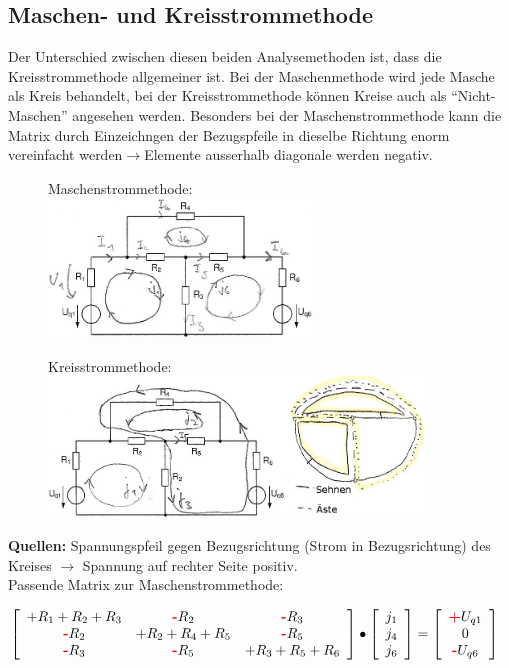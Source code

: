 \subsection{Maschen- und Kreisstrommethode}
Der Unterschied zwischen diesen beiden Analysemethoden ist, dass die Kreisstrommethode allgemeiner ist. Bei der Maschenmethode wird jede Masche als Kreis behandelt, bei der Kreisstrommethode können Kreise auch als "`Nicht-Maschen"' angesehen werden.
Besonders bei der Maschenstrommethode kann die Matrix durch Einzeichngen der Bezugspfeile in dieselbe Richtung enorm vereinfacht werden$\rightarrow$Elemente ausserhalb diagonale werden negativ.
\begin{figure}[hct]
  \begin{minipage}[t]{8 cm} %
	  \centering
	  Maschenstrommethode:\\
	  \includegraphics[width=7cm]{pics/dcnet/maschenmethode}
	 \end{minipage}
	 \begin{minipage}[t]{10 cm}
	  \centering
	  Kreisstrommethode:\\
	  \includegraphics[width=10cm]{pics/dcnet/kreisstrommethode} 
  \end{minipage}
\end{figure}

\textbf{Quellen:} Spannungspfeil gegen Bezugsrichtung (Strom in Bezugsrichtung) des Kreises $\rightarrow$ Spannung auf rechter Seite positiv.\\

Passende Matrix zur Maschenstrommethode:

$\left[\begin{array}{ccc}
	+R_1+R_2+R_3 &\text{\textbf{\textcolor{red}{-}}}R_2 &\text{\textbf{\textcolor{red}{-}}}R_3  \\
	\text{\textbf{\textcolor{red}{-}}}R_2 &+R_2+R_4+R_5
	&\text{\textbf{\textcolor{red}{-}}}R_5\\ 
	\text{\textbf{\textcolor{red}{-}}}R_3 &\text{\textbf{\textcolor{red}{-}}}R_5 &+R_3+R_5+R_6
	\end{array}\right] \bullet 
	\left[\begin{array}{l}j_1\\j_4\\j_6\end{array}\right] = 
	\left[\begin{array}{c}\text{\textbf{\textcolor{red}{+}}}U_{q1}\\0\\
	\text{\textbf{\textcolor{red}{-}}}U_{q6}
\end{array}\right]$\\

